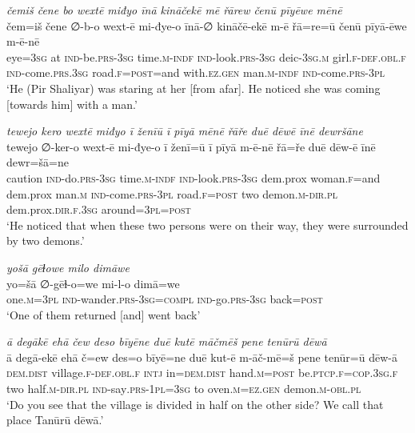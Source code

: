 \ea \label{ZP.66}
\textit{čemiš čene bo wextē miđyo īnā kināčekē mē řārew čenū pīyēwe mēnē} \\ 
\gll čem=iš čene ∅-b-o wext-ē mi-đye-o īnā-∅ kināčē-ekē m-ē řā=re=ū čenū pīyā-ēwe m-ē-nē \\ 
 eye\textsc{=3sg} at \textsc{ind-}be\textsc{.prs}\textsc{-3sg} time\textsc{.m}\textsc{-indf} \textsc{ind-}look\textsc{.prs}\textsc{-3sg} deic\textsc{-3sg}\textsc{.m} girl\textsc{.f}\textsc{-def}\textsc{.obl}\textsc{.f} \textsc{ind-}come\textsc{.prs}\textsc{.3sg} road\textsc{.f}\textsc{=\textsc{post}}=and with\textsc{.ez.gen} man\textsc{.m}\textsc{-indf} \textsc{ind-}come\textsc{.prs}\textsc{-3pl} \\ 
\glt `He (Pir Shaliyar) was staring at her [from afar]. He noticed she was coming [towards him] with a man.'
\z 
 
\ea \label{ZP.67}
\textit{tewejo kero wextē miđyo ī ženīū ī pīyā mēnē řāře duē dēwē īnē dewršāne} \\ 
\gll tewejo ∅-ker-o wext-ē mi-đye-o ī ženī=ū ī pīyā m-ē-nē řā=ře duē dēw-ē īnē dewr=šā=ne \\ 
 caution \textsc{ind-}do\textsc{.prs}\textsc{-3sg} time\textsc{.m}\textsc{-indf} \textsc{ind-}look\textsc{.prs}\textsc{-3sg} dem.prox woman\textsc{.f}=and dem.prox man\textsc{.m} \textsc{ind-}come\textsc{.prs}\textsc{-3pl} road\textsc{.f}\textsc{=\textsc{post}} two demon\textsc{.m}\textsc{-dir}\textsc{.pl} dem.prox\textsc{.dir}\textsc{.f}\textsc{.3sg} around\textsc{=3pl}\textsc{=\textsc{post}} \\ 
\glt `He noticed that when these two persons were on their way, they were surrounded by two demons.'
\z 
 
\ea \label{ZP.71}
\textit{yošā gēɫowe milo dimāwe} \\ 
\gll yo=šā ∅-gēɫ-o=we mi-l-o dimā=we \\ 
 one\textsc{.m}\textsc{=3pl} \textsc{ind-}wander\textsc{.prs}\textsc{-3sg}\textsc{=compl} \textsc{ind-}go\textsc{.prs}\textsc{-3sg} back\textsc{=\textsc{post}} \\ 
\glt `One of them returned [and] went back'
\z 
 
\ea \label{ZP.74}
\textit{ā degākē ehā čew deso bīyēne duē kutē māčmēš pene tenūrū dēwā} \\ 
\gll ā degā-ekē ehā č=ew des=o bīyē=ne duē kut-ē m-āč-mē=š pene tenūr=ū dēw-ā \\ 
 \textsc{dem.dist} village\textsc{.f}\textsc{-def}\textsc{.obl}\textsc{.f} \textsc{intj} in=\textsc{dem.dist} hand\textsc{.m}\textsc{=\textsc{post}} be\textsc{.ptcp}\textsc{.f}\textsc{=cop}\textsc{.3sg}\textsc{.f} two half\textsc{.m}\textsc{-dir}\textsc{.pl} \textsc{ind-}say\textsc{.prs}\textsc{-1pl}\textsc{=3sg} to oven\textsc{.m}\textsc{\textsc{=ez.gen}} demon\textsc{.m}\textsc{-obl}\textsc{.pl} \\ 
\glt `Do you see that the village is divided in half on the other side? We call that place Tanūrū dēwā.'
\z 
 
